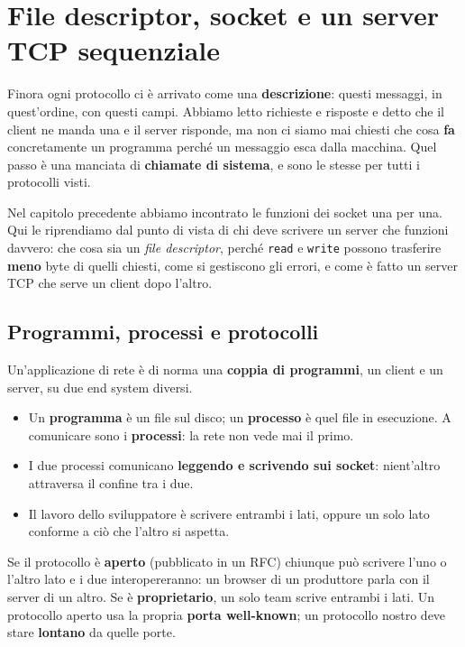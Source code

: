 \chapter{File descriptor, socket e un server TCP sequenziale}

Finora ogni protocollo ci è arrivato come una \textbf{descrizione}: questi messaggi, in quest'ordine, con questi campi.
Abbiamo letto richieste e risposte e detto che il client ne manda una e il server risponde, ma non ci siamo mai chiesti che
cosa \textbf{fa} concretamente un programma perché un messaggio esca dalla macchina. Quel passo è una manciata di
\textbf{chiamate di sistema}, e sono le stesse per tutti i protocolli visti.

Nel capitolo precedente abbiamo incontrato le funzioni dei socket una per una. Qui le riprendiamo dal punto di vista di
chi deve scrivere un server che funzioni davvero: che cosa sia un \emph{file descriptor}, perché \texttt{read} e
\texttt{write} possono trasferire \textbf{meno} byte di quelli chiesti, come si gestiscono gli errori, e come è fatto un
server TCP che serve un client dopo l'altro.

\section{Programmi, processi e protocolli}

Un'applicazione di rete è di norma una \textbf{coppia di programmi}, un client e un server, su due end system diversi.
\begin{itemize}
    \item Un \textbf{programma} è un file sul disco; un \textbf{processo} è quel file in esecuzione. A comunicare sono i
          \textbf{processi}: la rete non vede mai il primo.
    \item I due processi comunicano \textbf{leggendo e scrivendo sui socket}: nient'altro attraversa il confine tra i due.
    \item Il lavoro dello sviluppatore è scrivere entrambi i lati, oppure un solo lato conforme a ciò che l'altro si aspetta.
\end{itemize}

Se il protocollo è \textbf{aperto} (pubblicato in un RFC) chiunque può scrivere l'uno o l'altro lato e i due
interopereranno: un browser di un produttore parla con il server di un altro. Se è \textbf{proprietario}, un solo team
scrive entrambi i lati. Un protocollo aperto usa la propria \textbf{porta well-known}; un protocollo nostro deve stare
\textbf{lontano} da quelle porte.


